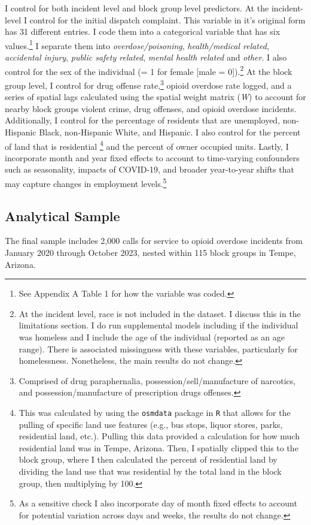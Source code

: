 I control for both incident level and block group level predictors. At the incident-level I control for the initial dispatch complaint. This variable in it's original form has 31 different entries. I code them into a categorical variable that has six values.\footnote{See Appendix A Table 1 for how the variable was coded.} I separate them into \textit{overdose/poisoning}, \textit{health/medical related}, \textit{accidental injury}, \textit{public safety related}, \textit{mental health related} and \textit{other}. I also control for the sex of the individual (= 1 for female [male = 0]).\footnote{At the incident level, race is not included in the dataset. I discuss this in the limitations section. I do run supplemental models including if the individual was homeless and I include the age of the individual (reported as an age range). There is associated missingness with these variables, particularly for homelessness. Nonetheless, the main results do not change.} At the block group level, I control for drug offense rate,\footnote{Comprised of drug paraphernalia, possession/sell/manufacture of narcotics, and possession/manufacture of prescription drugs offenses.} opioid overdose rate logged, and a series of spatial lags calculated using the spatial weight matrix (\textit{W}) to account for nearby block groups violent crime, drug offenses, and opioid overdose incidents. Additionally, I control for the percentage of residents that are unemployed, non-Hispanic Black, non-Hispanic White, and Hispanic. I also control for the percent of land that is residential \footnote{This was calculated by using the \texttt{osmdata} package in \texttt{R} that allows for the pulling of specific land use features (e.g., bus stops, liquor stores, parks, residential land, etc.). Pulling this data provided a calculation for how much residential land was in Tempe, Arizona. Then, I spatially clipped this to the block group, where I then calculated the percent of residential land by dividing the land use that was residential by the total land in the block group, then multiplying by 100.} and the percent of owner occupied units. Lastly, I incorporate month and year fixed effects to account to time-varying confounders such as seasonality, impacts of COVID-19, and broader year-to-year shifts that may capture changes in employment levels.\footnote{As a sensitive check I also incorporate day of month fixed effects to account for potential variation across days and weeks, the results do not change.}

\subsection{Analytical Sample}
The final sample includes 2,000 calls for service to opioid overdose incidents from January 2020 through October 2023, nested within 115 block groups in Tempe, Arizona.

